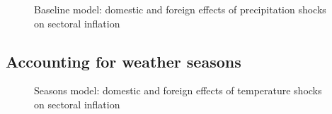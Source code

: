 \documentclass[
  letterpaper,
  DIV=11,
  numbers=noendperiod]{scrartcl}
\begin{document}
\begin{figure}[H]


\caption{\label{fig-baseline_precip}Baseline model: domestic and foreign
effects of precipitation shocks on sectoral inflation}

\end{figure}%

\subsection{Accounting for weather
seasons}\label{accounting-for-weather-seasons}

\begin{figure}[H]


\caption{\label{fig-seasonal_temp}Seasons model: domestic and foreign
effects of temperature shocks on sectoral inflation}

\end{figure}%
\end{document}
